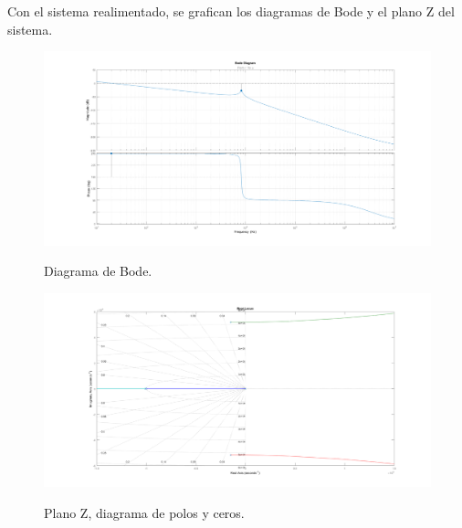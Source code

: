 Con el sistema realimentado, se grafican los diagramas de Bode y el plano Z del sistema.
\begin{figure}[H]
	\centering
	\includegraphics[width=0.9\linewidth]{ImagenesParteIII/Bode.png}
	\label{fig:bode}
	\caption{Diagrama de Bode.}
\end{figure}

\begin{figure}[H]
	\centering
	\includegraphics[width=0.9\linewidth]{ImagenesParteIII/Rlocus.png}
	\label{fig:zplane}
	\caption{Plano Z, diagrama de polos y ceros.}
\end{figure}

%